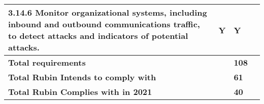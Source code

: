 \begin{longtable} {|p{}|p{}|p{}|p{} |}
{3.14.6 Monitor organizational systems, including inbound and outbound communications traffic, to detect attacks and indicators of potential attacks.}&{Y}&{Y}& \\ \hline
\textbf{Total requirements}&\textbf{}&\textbf{108}& \\ \hline
\textbf{Total Rubin Intends to comply with }&\textbf{}&\textbf{61}& \\ \hline
\textbf{Total Rubin Complies with in 2021}&\textbf{}&\textbf{40}& \\ \hline
\end{longtable} \normalsize
